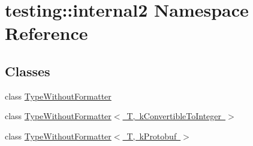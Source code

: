 \hypertarget{namespacetesting_1_1internal2}{}\section{testing\+::internal2 Namespace Reference}
\label{namespacetesting_1_1internal2}
\subsection*{Classes}
\begin{DoxyCompactItemize}
\item 
class \mbox{\hyperlink{classtesting_1_1internal2_1_1_type_without_formatter}{Type\+Without\+Formatter}}
\item 
class \mbox{\hyperlink{classtesting_1_1internal2_1_1_type_without_formatter_3_01_t_00_01k_convertible_to_integer_01_4}{Type\+Without\+Formatter$<$ T, k\+Convertible\+To\+Integer $>$}}
\item 
class \mbox{\hyperlink{classtesting_1_1internal2_1_1_type_without_formatter_3_01_t_00_01k_protobuf_01_4}{Type\+Without\+Formatter$<$ T, k\+Protobuf $>$}}
\end{DoxyCompactItemize}
